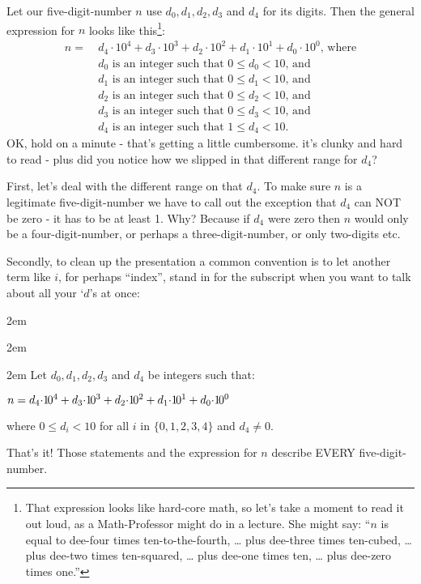 \documentclass{article}
\newenvironment{jprIn}{\begin{adjustwidth}{2em}{}}{\end{adjustwidth}}
\begin{document}
Let our five-digit-number $n$ use $d_0,d_1,d_2,d_3$ and $d_4$ for its digits. Then
the general expression for $n$ looks like this\footnote{That expression looks like
hard-core math, so let's take a moment
to read it out loud, as a Math-Professor might do in a lecture.  She might say:
``$n$ is equal to dee-four times ten-to-the-fourth, \dots{}
plus dee-three times ten-cubed, \dots{} plus dee-two times ten-squared,
  \dots{} plus dee-one times ten,  \dots{} plus dee-zero times one.''}:
\begin{align*}
n =\ &d_4{\cdot}10^4+d_3{\cdot}10^3+d_2{\cdot}10^2+d_1{\cdot}10^1+d_0{\cdot}10^0\text{, where}\\
& d_0\text{ is an integer such that }0\le{}d_0<10\text{, and}\\
& d_1\text{ is an integer such that }0\le{}d_1<10\text{, and}\\
& d_2\text{ is an integer such that }0\le{}d_2<10\text{, and}\\
& d_3\text{ is an integer such that }0\le{}d_3<10\text{, and}\\
& d_4\text{ is an integer such that }1\le{}d_4<10.
\end{align*}
OK, hold on a minute - that's getting a little cumbersome. it's clunky and hard to read -
plus did  you notice how we slipped in that different range for $d_4$?

First, let's deal with the different range on that $d_4$. To make sure $n$ is a
legitimate five-digit-number we have to
call out the exception that $d_4$ can NOT be zero - it has to be at least 1.
Why? Because if $d_4$ were zero then $n$ would only be a
four-digit-number, or perhaps a three-digit-number, or only two-digits etc.

Secondly, to clean up the presentation
a common convention
is to let another term like $i$, for perhaps ``index'', stand in for the subscript
when you want to talk about all your `$d$'s at once:
\begin{jprIn}
\begin{jprIn}
\begin{jprIn}
Let $d_0, d_1, d_2,d_3$ and $d_4$ be integers such that:

\hspace{3em}$n
=d_4{\cdot}{1\hspace{-0.12em}0}^4
+d_3{\cdot}{1\hspace{-0.12em}0}^3
+d_2{\cdot}{1\hspace{-0.12em}0}^2
+d_1{\cdot}{1\hspace{-0.12em}0}^1
+d_0{\cdot}{1\hspace{-0.12em}0}^0$

where $0\le{}d_i<10$ for all $i$ in $\{0,1,2,3,4\}$ and $d_4\ne0$.
\end{jprIn}
\end{jprIn}
\end{jprIn}
That's it! Those statements and the expression for $n$ describe EVERY five-digit-number.
\end{document}
